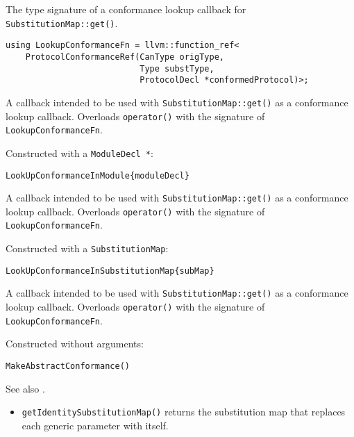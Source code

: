 \documentclass[../generics]{subfiles}
\begin{document}
The type signature of a conformance lookup callback for \texttt{SubstitutionMap::get()}.
\begin{verbatim}
using LookupConformanceFn = llvm::function_ref<
    ProtocolConformanceRef(CanType origType,
                           Type substType,
                           ProtocolDecl *conformedProtocol)>;
\end{verbatim}

A callback intended to be used with \texttt{SubstitutionMap::get()} as a conformance lookup callback. Overloads \texttt{operator()} with the signature of \texttt{LookupConformanceFn}.

Constructed with a \texttt{ModuleDecl *}:
\begin{Verbatim}
LookUpConformanceInModule{moduleDecl}
\end{Verbatim}

A callback intended to be used with \texttt{SubstitutionMap::get()} as a conformance lookup callback. Overloads \texttt{operator()} with the signature of \texttt{LookupConformanceFn}.

Constructed with a \texttt{SubstitutionMap}:
\begin{Verbatim}
LookUpConformanceInSubstitutionMap{subMap}
\end{Verbatim}

A callback intended to be used with \texttt{SubstitutionMap::get()} as a conformance lookup callback. Overloads \texttt{operator()} with the signature of \texttt{LookupConformanceFn}.

Constructed without arguments:
\begin{Verbatim}
MakeAbstractConformance()
\end{Verbatim}

See also .

\begin{itemize}
\item \texttt{getIdentitySubstitutionMap()} returns the substitution map that replaces each generic parameter with itself.
\end{itemize}
\end{document}
